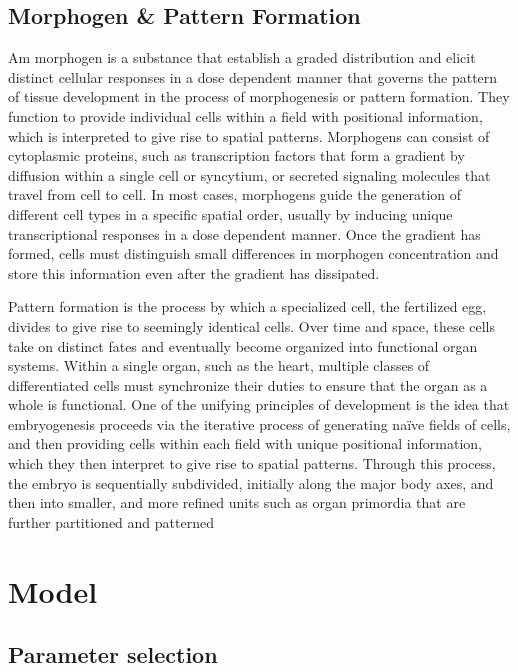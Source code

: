 \documentclass[12pt]{article}
\begin{document}
\subsection{Morphogen \& Pattern Formation}


Am morphogen is a substance that establish a graded distribution and elicit distinct cellular responses in a dose dependent manner that governs the pattern of tissue development in the process of morphogenesis or pattern formation. 
They function to provide individual cells within a field with positional information, which is interpreted to give rise to spatial patterns.
Morphogens can consist of cytoplasmic proteins, such as transcription factors that form a gradient by diffusion within a single cell or syncytium, or secreted signaling molecules that travel from cell to cell. 
In most cases, morphogens guide the generation of different cell types in a specific spatial order, usually by inducing unique transcriptional responses in a dose dependent manner.
Once the gradient has formed, cells must distinguish small differences in morphogen concentration and store this information even after the gradient has dissipated.

Pattern formation is the process by which a specialized cell, the fertilized egg, divides to give rise to seemingly identical cells. 
Over time and space, these cells take on distinct fates and eventually become organized into functional organ systems. 
Within a single organ, such as the heart, multiple classes of differentiated cells must synchronize their duties to ensure that the organ as a whole is functional. 
One of the unifying principles of development is the idea that embryogenesis proceeds via the iterative process of generating naïve fields of cells, and then providing cells within each field with unique positional information, which they then interpret to give rise to spatial patterns. 
Through this process, the embryo is sequentially subdivided, initially along the major body axes, and then into smaller, and more refined units such as organ primordia that are further partitioned and patterned

\section{Model}

\subsection{Parameter selection}
\end{document}

